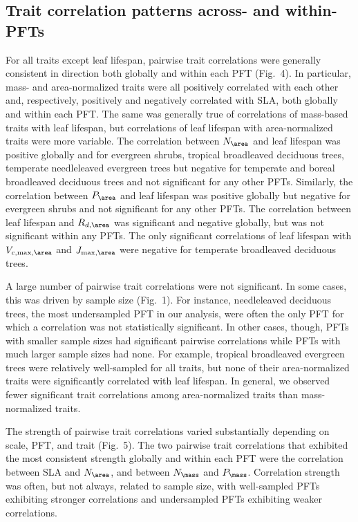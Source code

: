 \subsection{Trait correlation patterns across- and within-PFTs}

For all traits except leaf lifespan, pairwise trait correlations were generally consistent in direction both globally and within each PFT (Fig.\ 4).
In particular, mass- and area-normalized traits were all positively correlated with each other and, respectively, positively and negatively correlated with SLA, both globally and within each PFT\@.
The same was generally true of correlations of mass-based traits with leaf lifespan, but correlations of leaf lifespan with area-normalized traits were more variable.
The correlation between $N_{\area}$ and leaf lifespan was positive globally and for evergreen shrubs, tropical broadleaved deciduous trees, temperate needleleaved evergreen trees but negative for temperate and boreal broadleaved deciduous trees and not significant for any other PFTs.
Similarly, the correlation between $P_{\area}$ and leaf lifespan was positive globally but negative for evergreen shrubs and not significant for any other PFTs.
The correlation between leaf lifespan and $R_{d,\area}$ was significant and negative globally, but was not significant within any PFTs.
The only significant correlations of leaf lifespan with $V_{c,\max,\area}$ and $J_{\max,\area}$ were negative for temperate broadleaved deciduous trees.

A large number of pairwise trait correlations were not significant.
In some cases, this was driven by sample size (Fig.\ 1).
For instance, needleleaved deciduous trees, the most undersampled PFT in our analysis, were often the only PFT for which a correlation was not statistically significant.
In other cases, though, PFTs with smaller sample sizes had significant pairwise correlations while PFTs with much larger sample sizes had none.
For example, tropical broadleaved evergreen trees were relatively well-sampled for all traits, but none of their area-normalized traits were significantly correlated with leaf lifespan.
In general, we observed fewer significant trait correlations among area-normalized traits than mass-normalized traits. 

The strength of pairwise trait correlations varied substantially depending on scale, PFT, and trait (Fig.\ 5).
The two pairwise trait correlations that exhibited the most consistent strength globally and within each PFT were the correlation between SLA and $N_{\area}$, and between $N_{\mass}$ and $P_{\mass}$.
Correlation strength was often, but not always, related to sample size, with well-sampled PFTs exhibiting stronger correlations and undersampled PFTs exhibiting weaker correlations.
